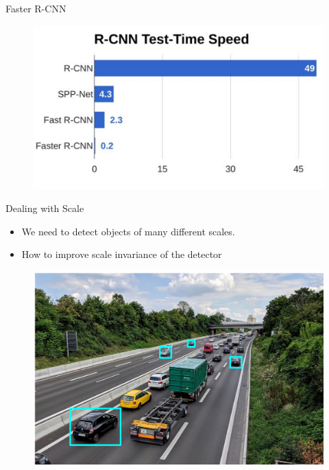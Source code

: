\documentclass[10pt]{beamer}
\theoremstyle{remark}
\theoremstyle{definition}
\begin{document}
\begin{frame}[allowframebreaks]{Faster R-CNN}
\begin{figure}
\centering
\includegraphics[width=1.0\textwidth,height=1.0\textheight,keepaspectratio]{./images/faster_rcnn_3.png}
\end{figure}
\end{frame}

\begin{frame}{Dealing with Scale}
\begin{itemize}
    \item We need to detect objects of many different scales.
    \item How to improve scale invariance of the detector
\end{itemize}

\begin{figure}
\centering
\includegraphics[width=1.0\textwidth,height=0.7\textheight,keepaspectratio]{./images/scale_1.png}
\end{figure}
    
\end{frame}
\end{document}
